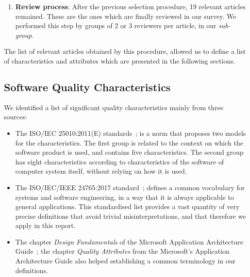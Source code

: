\documentclass[a4paper]{article}
\begin{document}
\begin{enumerate}
    \item \textbf{Review process}: After the previous selection procedure, 19 relevant articles remained. These are the ones which are finally reviewed in our survey. We performed this step by groups of 2 or 3 reviewers per article, in our \textit{sub-group}.
\end{enumerate}

The list of relevant articles obtained by this procedure, allowed us to define a list of characteristics and attributes which are presented in the following sections.

\subsection{Software Quality Characteristics}
\label{subsect:sqchar}

We identified a list of significant quality characteristics mainly from three sources:

\begin{itemize}
    \item The ISO/IEC 25010:2011(E) standards~\cite{iso_25010_2011_2017}; is a norm that proposes two models for the characteristics. The first group is related to the context on which the software product is used, and contains five characteristics. The second group has eight characteristics according to characteristics of the software of computer system itself, without relying on how it is used.

    \item The ISO/IEC/IEEE 24765:2017 standard~\cite{iso_iec_24765_2017}; defines a common vocabulary for systems and software engineering, in a way that it is always applicable to general applications. This standardised list provides a vast quantity of very precise definitions that avoid trivial misinterpretations, and that therefore we apply in this report.

    \item The chapter \textit{Design Fundamentals} of the Microsoft Application Architecture Guide~\cite{microsoft_2010}; the chapter \textit{Quality Attributes} from the Microsoft's Application Architecture Guide also helped establishing a common terminology in our definitions.

\end{itemize}
\end{document}
